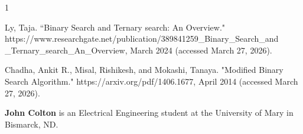 \documentclass[journal]{IEEEtran}
\begin{document}


%
%
%
\begin{thebibliography}{1}

Ly, Taja. ``Binary Search and Ternary search: An Overview." https://www.researchgate.net/publication/389841259\_Binary\_Search\_and\\\_Ternary\_search\_An\_Overview, March 2024 (accessed March 27, 2026).

Chadha, Ankit R., Misal, Rishikesh, and Mokashi, Tanaya. "Modified Binary Search Algorithm." https://arxiv.org/pdf/1406.1677, April 2014 (accessed March 27, 2026).


\end{thebibliography}

\bigskip


\textbf{John Colton} is an Electrical Engineering student at the University of Mary in Bismarck, ND.






\end{document}
